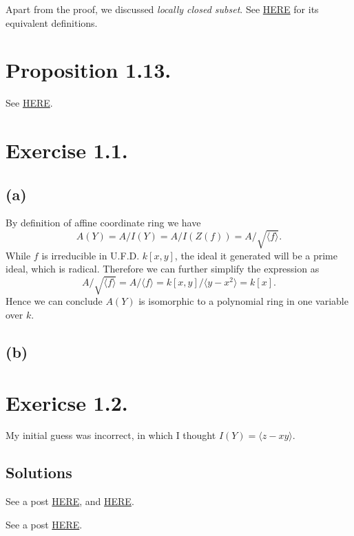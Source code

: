 Apart from the proof, we discussed \textit{locally closed subset}.
See \href{https://en.wikipedia.org/wiki/Locally_closed_subset}{HERE} for its equivalent definitions.

\section{Proposition 1.13.}

See \href{https://math.stackexchange.com/questions/1292811/help-with-proposition-1-13-in-hartshornes-algebraic-geometry}{HERE}.

\section{Exercise 1.1.}

\subsection{(a)}

By definition of affine coordinate ring we have 
\[A(Y)=A/I(Y)=A/I(Z(f))=A/\sqrt{\langle f\rangle}.\]
While $f$ is irreducible in U.F.D. $k[x,y]$, the ideal it generated will be a prime ideal, which is radical. Therefore we can further simplify the expression as 
\[A/\sqrt{\langle f\rangle}=A/\langle f\rangle=k[x,y]/\langle y-x^2\rangle=k[x].\]
Hence we can conclude $A(Y)$ is isomorphic to a polynomial ring in one variable over $k$.

\subsection{(b)}

\section{Exericse 1.2.}

My initial guess was incorrect, in which I thought $I(Y)=\langle z-xy\rangle$.

\subsection{Solutions}

See a post \href{https://math.stackexchange.com/questions/3137828/proving-y-x2-z-xy-generate-the-ideal-of-the-twisted-cubic}{HERE}, and \href{https://math.stackexchange.com/questions/568528/the-twisted-cubic-is-an-affine-variety}{HERE}.

See a post \href{https://math.stackexchange.com/questions/1864637/the-affine-coordinate-ring-of-twisted-cubic-curve-y-is-ay-kx-y-z-z-x3}{HERE}.

